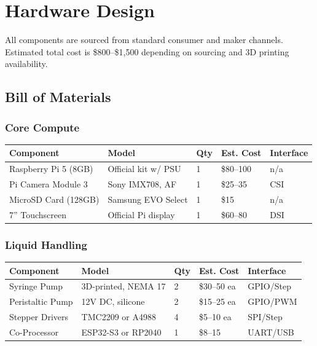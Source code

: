 \documentclass[11pt,letterpaper]{article}
\begin{document}
\section{Hardware Design}

All components are sourced from standard consumer and maker channels. Estimated total cost is \$800--\$1,500 depending on sourcing and 3D printing availability.

\subsection{Bill of Materials}

\subsubsection{Core Compute}

{\centering\begin{tabularx}{\textwidth}{Y L{4.2cm} L{0.9cm} L{2.3cm} L{2.4cm}}
\toprule
\textbf{Component} & \textbf{Model} & \textbf{Qty} & \textbf{Est. Cost} & \textbf{Interface} \\
\midrule
Raspberry Pi 5 (8GB) & Official kit w/ PSU & 1 & \$80--100 & n/a \\
Pi Camera Module 3 & Sony IMX708, AF & 1 & \$25--35 & CSI \\
MicroSD Card (128GB) & Samsung EVO Select & 1 & \$15 & n/a \\
7'' Touchscreen & Official Pi display & 1 & \$60--80 & DSI \\
\bottomrule
\end{tabularx}\par}

\subsubsection{Liquid Handling}

{\centering\begin{tabularx}{\textwidth}{Y L{4.2cm} L{0.9cm} L{2.3cm} L{2.4cm}}
\toprule
\textbf{Component} & \textbf{Model} & \textbf{Qty} & \textbf{Est. Cost} & \textbf{Interface} \\
\midrule
Syringe Pump & 3D-printed, NEMA 17 & 2 & \$30--50 ea & GPIO/Step \\
Peristaltic Pump & 12V DC, silicone & 2 & \$15--25 ea & GPIO/PWM \\
Stepper Drivers & TMC2209 or A4988 & 4 & \$5--10 ea & SPI/Step \\
Co-Processor & ESP32-S3 or RP2040 & 1 & \$8--15 & UART/USB \\
\bottomrule
\end{tabularx}\par}
\end{document}
